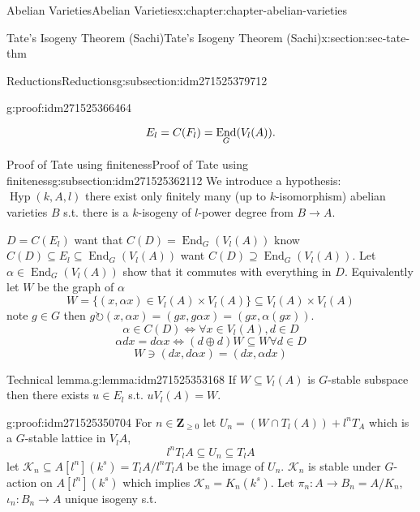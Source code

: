 \documentclass[oneside,10pt,]{book}
\newcommand{\qedhere}{\relax}
\numberwithin{equation}{section}
\newcommand{\lb}{[}
\newcommand{\rb}{]}
\newcommand{\ZZ}{\mathbf{Z}}
\newcommand{\acts}{\circlearrowright}
\DeclareMathOperator{\End}{End}
\begin{document}
\begin{chapterptx}{Abelian Varieties}{}{Abelian Varieties}{}{}{x:chapter:chapter-abelian-varieties}
\begin{sectionptx}{Tate's Isogeny Theorem (Sachi)}{}{Tate's Isogeny Theorem (Sachi)}{}{}{x:section:sec-tate-thm}
\begin{subsectionptx}{Reductions}{}{Reductions}{}{}{g:subsection:idm271525379712}
\begin{proofptx}{}{g:proof:idm271525366464}
\begin{enumerate}
\begin{equation*}
E_l = C(F_l) = \End_G(V_l(A))\text{.}\qedhere
\end{equation*}
%
\end{enumerate}
%
\end{proofptx}
\end{subsectionptx}
%
%
\typeout{************************************************}
\typeout{************************************************}
%
\begin{subsectionptx}{Proof of Tate using finiteness}{}{Proof of Tate using finiteness}{}{}{g:subsection:idm271525362112}
We introduce a hypothesis: \(\operatorname{Hyp}(k,A,l)\) there exist only finitely many (up to \(k\)-isomorphism) abelian varieties \(B\) s.t. there is a \(k\)-isogeny of \(l\)-power degree from \(B\to A\).%
\par
\(D =C(E_l)\) want that \(C(D) = \End_G(V_l(A))\) know \(C(D) \subseteq E_l \subseteq \End_G(V_l(A))\) want \(C(D) \supseteq \End_G(V_l(A))\). Let \(\alpha \in \End_G(V_l(A))\) show that it commutes with everything in \(D\). Equivalently let \(W\) be the graph of \(\alpha\)%
\begin{equation*}
W = \{(x,\alpha x) \in V_l(A)\times V_l(A)\} \subseteq V_l(A)\times V_l(A)
\end{equation*}
note \(g\in G\) then \(g\acts (x,\alpha x) = (gx,g\alpha x ) = (gx, \alpha(gx))\).%
\begin{equation*}
\alpha\in C(D) \iff \forall x\in V_l(A), d\in D
\end{equation*}
%
\begin{equation*}
\alpha d x = d\alpha x \iff (d\oplus d)W \subseteq W \forall d\in D
\end{equation*}
%
\begin{equation*}
W\ni (dx, d\alpha x) = (dx, \alpha d x)
\end{equation*}
%
\begin{lemma}{Technical lemma.}{}{g:lemma:idm271525353168}%
If \(W\subseteq V_l(A)\) is \(G\)-stable subspace then there exists \(u\in E_l\) s.t. \(u V_l(A) = W\).%
\end{lemma}
\begin{proofptx}{}{g:proof:idm271525350704}
For \(n \in \ZZ_{\ge 0}\) let \(U_n = (W\cap T_l(A)) + l^n T_A\) which is a \(G\)-stable lattice in \(V_l A\),%
\begin{equation*}
l^nT_lA \subseteq U_n \subseteq T_l A
\end{equation*}
let \(\mathcal K_n \subseteq A\lb l^n \rb (k^s) = T_l A/ l^n T_l A\) be the image of \(U_n\). \(\mathcal K_n\) is stable under \(G\)-action on \(A\lb l^n \rb (k^s)\) which implies \(\mathcal K_n = K_n (k^s)\). Let \(\pi_n \colon A \to B_n = A/ K_n\), \(\iota_n \colon B_n \to A\) unique isogeny s.t.%

\end{proofptx}
\end{subsectionptx}
\end{sectionptx}
\end{chapterptx}
\end{document}
